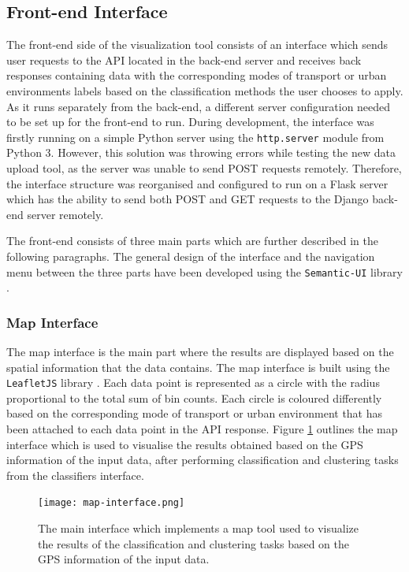 \documentclass[bsc,frontabs,twoside,singlespacing, parskip,deptreport]{infthesis}     %
\begin{document}
\subsection{Front-end Interface}
\label{subsec:front-end}

The front-end side of the visualization tool consists of an interface which sends user requests to the API located in the back-end server and receives back responses containing data with the corresponding modes of transport or urban environments labels based on the classification methods the user chooses to apply. As it runs separately from the back-end, a different server configuration needed to be set up for the front-end to run. During development, the interface was firstly running on a simple Python server using the \texttt{http.server} module from Python 3. However, this solution was throwing errors while testing the new data upload tool, as the server was unable to send POST requests remotely. Therefore, the interface structure was reorganised and configured to run on a Flask server \cite{flask} which has the ability to send both POST and GET requests to the Django back-end server remotely.

The front-end consists of three main parts which are further described in the following paragraphs. The general design of the interface and the navigation menu between the three parts have been developed using the \texttt{Semantic-UI} library \cite{semantic-ui}.

\subsubsection*{Map Interface}

The map interface is the main part where the results are displayed based on the spatial information that the data contains.  The map interface is built using the \texttt{LeafletJS} library \cite{leaflet}. Each data point is represented as a circle with the radius proportional to the total sum of bin counts. Each circle is coloured differently based on the corresponding mode of transport or urban environment that has been attached to each data point in the API response. Figure \ref{fig:map-interface} outlines the map interface which is used to visualise the results obtained based on the GPS information of the input data, after performing classification and clustering tasks from the classifiers interface.

\begin{figure}[h!]
  \texttt{[image: map-interface.png]}
  \caption{The main interface which implements a map tool used to visualize the results of the classification and clustering tasks based on the GPS information of the input data.}
  \label{fig:map-interface}
\end{figure}
\end{document}
